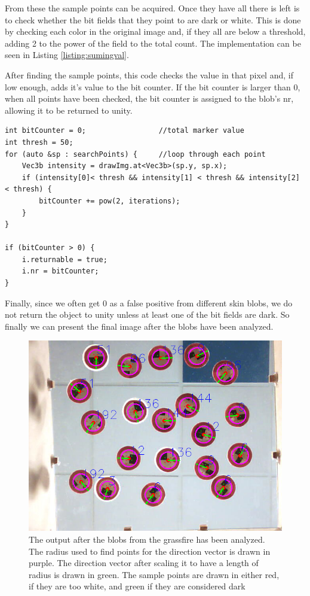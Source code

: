From these the sample points can be acquired. Once they have all there is left is to check whether the bit fields that they point to are dark or white. This is done by checking each color in the original image and, if they all are below a threshold, adding 2 to the power of the field to the total count. The implementation can be seen in Listing \ref{listing:sumingval}.
 \begin{listing}[H]
 	\caption{After finding the sample points, this code checks the value in that pixel and, if low enough, adds it's value to the bit counter. If the bit counter is larger than 0, when all points have been checked, the bit counter is assigned to the blob's nr, allowing it to be returned to unity.}
 	\begin{verbatim}
int bitCounter = 0;					//total marker value
int thresh = 50;
for (auto &sp : searchPoints) {		//loop through each point
	Vec3b intensity = drawImg.at<Vec3b>(sp.y, sp.x);
	if (intensity[0]< thresh && intensity[1] < thresh && intensity[2] < thresh) {
		bitCounter += pow(2, iterations);
	}
}

if (bitCounter > 0) {
	i.returnable = true;
	i.nr = bitCounter;
}
 	\end{verbatim}
 	\label{listing:sumingval}
\end{listing}
Finally, since we often get 0 as a false positive from different skin blobs, we do not return the object to unity unless at least one of the bit fields are dark.
So finally we can present the final image after the blobs have been analyzed. 
\begin{figure}[H]
	\centering
	\includegraphics[width=1\linewidth]{figure/Analysis/output.png}
	\caption{The output after the blobs from the grassfire has been analyzed. The radius used to find points for the direction vector is drawn in purple. The direction vector after scaling it to have a length of radius is drawn in green. The sample points are drawn in either red, if they are too white, and green if they are considered dark} 
	\label{fig:output}
\end{figure}

